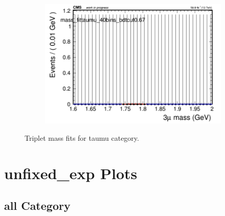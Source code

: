 \begin{figure}[H]
\begin{subfigure}{0.2\textwidth}
        \caption{}
    \end{subfigure}
    \begin{subfigure}{0.2\textwidth}
        \includegraphics[width=\textwidth]{flat_fit/plots/taumu/massfit_taumu_40bins_bdtcut0.67.png}
        \caption{}
    \end{subfigure}
    \caption{Triplet mass fits for taumu category.}
    \label{fig:flatfittaumu}
\end{figure}

\section{unfixed\_exp Plots}

\subsection{all Category}
\label{sec:unfixedexpall}

